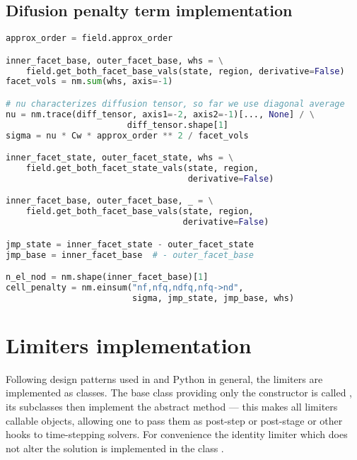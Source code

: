 \subsection{Difusion penalty term implementation}
\label{se:diff_penal_term_imp}
\setcounter{lstannotation}{0}
\begin{lstlisting}[language=Python, caption=Computation of penalty cell
fluxes.]
approx_order = field.approx_order

inner_facet_base, outer_facet_base, whs = \
    field.get_both_facet_base_vals(state, region, derivative=False)
facet_vols = nm.sum(whs, axis=-1)

# nu characterizes diffusion tensor, so far we use diagonal average
nu = nm.trace(diff_tensor, axis1=-2, axis2=-1)[..., None] / \
                        diff_tensor.shape[1]
sigma = nu * Cw * approx_order ** 2 / facet_vols

inner_facet_state, outer_facet_state, whs = \
    field.get_both_facet_state_vals(state, region,
                                    derivative=False)

inner_facet_base, outer_facet_base, _ = \
    field.get_both_facet_base_vals(state, region,
                                   derivative=False)

jmp_state = inner_facet_state - outer_facet_state
jmp_base = inner_facet_base  # - outer_facet_base

n_el_nod = nm.shape(inner_facet_base)[1]
cell_penalty = nm.einsum("nf,nfq,ndfq,nfq->nd",
                         sigma, jmp_state, jmp_base, whs)

\end{lstlisting}

\section{Limiters implementation}
Following design patterns used in \sfepy{} and Python in general, the limiters are
implemented as classes. The base class providing only the constructor is called , its
subclasses then implement the abstract method  --- this makes all limiters callable
objects, allowing one to pass them as post-step or post-stage or other hooks to time-stepping
solvers. For convenience the identity limiter which does not alter the solution is 
implemented in the class \pysauce{IdentityLimiter}.


